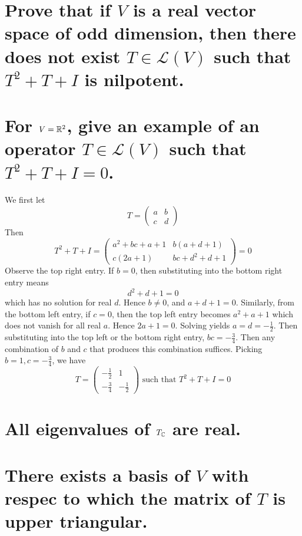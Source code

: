 \documentclass[answers]{exam}
\begin{document}
\begin{questions}
\begin{parts}
\end{parts}


\begin{parts}
    \part{Prove that if $V$ is a real vector space of odd dimension, then there does not exist $T \in \mathcal L(V)$ such that $T^2+T+I$ is nilpotent.}

    \part{For $V=\mathbb{R}^2$, give an example of an operator $T \in \mathcal L(V)$ such that $T^2+T+I=0$.}

    \begin{solution}
        We first let
        $$T = \begin{pmatrix} a & b \\ c & d \end{pmatrix}$$
        Then
        $$T^2 + T + I = \begin{pmatrix} a^2+bc+a+1 & b(a+d+1) \\ c(2a+1) & bc+d^2+d+1 \end{pmatrix} = 0$$
        Observe the top right entry. If $b=0$, then substituting into the bottom right entry means
        $$d^2+d+1=0$$
        which has no solution for real $d$. Hence $b\neq 0$, and $a+d+1=0$. Similarly, from the bottom left entry, if $c=0$, then the top left entry becomes $a^2+a+1$ which does not vanish for all real $a$. Hence $2a+1=0$. Solving yields $a=d=-\frac{1}{2}$. Then substituting into the top left or the bottom right entry, $bc=-\frac{3}{4}$. Then any combination of $b$ and $c$ that produces this combination suffices. Picking $b=1,c=-\frac{3}{4}$, we have
        $$T = \begin{pmatrix} -\frac{1}{2} & 1 \\ -\frac{3}{4} & -\frac{1}{2} \end{pmatrix} \text{ such that } T^2 + T + I = 0$$
    \end{solution}

\end{parts}


\begin{parts}
    \part{All eigenvalues of $T_{\mathbb{C}}$ are real.}
    \part{There exists a basis of $V$ with respec to which the matrix of $T$ is upper triangular.}
\end{parts}


\end{questions}
\end{document}
